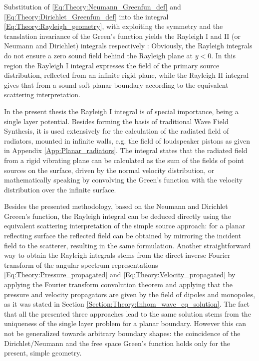 Substitution of \eqref{Eq:Theory:Neumann_Greenfun_def} and \eqref{Eq:Theory:Dirichlet_Greenfun_def} into the integral \eqref{Eq:Theory:Rayleigh_geometry}, with exploiting the symmetry and the translation invariance of the Green's function yields the Rayleigh I and II (or Neumann and Dirichlet) integrals respectively \cite{Berkhout1984}:
Obviously, the Rayleigh integrals do not ensure a zero sound field behind the Rayleigh plane at $y<0$.
In this region the Rayleigh I integral expresses the field of the primary source distribution, reflected from an infinite rigid plane, while the Rayleigh II integral gives that from a sound soft planar boundary according to the equivalent scattering interpretation.

In the present thesis the Rayleigh I integral is of special importance, being a single layer potential.
Besides forming the basis of traditional Wave Field Synthesis, it is used extensively for the calculation of the radiated field of radiators, mounted in infinite walls, e.g. the field of loudspeaker pistons as given in Appendix \ref{App:Planar_radiators}.
The integral states that the radiated field from a rigid vibrating plane can be calculated as the sum of the fields of point sources on the surface, driven by the normal velocity distribution, or mathematically speaking by convolving the Green's function with the velocity distribution over the infinite surface.

\vspace{3mm}
Besides the presented methodology, based on the Neumann and Dirichlet Greeen's function, the Rayleigh integral can be deduced directly using the equivalent scattering interpretation of the simple source approach: for a planar reflecting surface the reflected field can be obtained by mirroring the incident field to the scatterer, resulting in the same formulation.
Another straightforward way to obtain the Rayleigh integrals stems from the direct inverse Fourier transform of the angular spectrum representations \eqref{Eq:Theory:Pressure_propagated} and \eqref{Eq:Theory:Velocity_propagated} by applying the Fourier transform convolution theorem and applying that the pressure and velocity propagators are given by the field of dipoles and monopoles, as it was stated in Section \ref{Section:Theory:Inhom_wave_eq_solution}.
The fact that all the presented three approaches lead to the same solution stems from the uniqueness of the single layer problem for a planar boundary.
However this can not be generalized towards arbitrary boundary shapes: the coincidence of the Dirichlet/Neumann and the free space Green's function holds only for the present, simple geometry. 